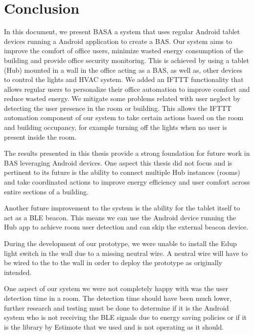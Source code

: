 \documentclass[conference]{IEEEtran}
\begin{document}
\section*{Conclusion}

In this document, we present BASA a system that uses regular Android tablet devices running a Android application to create a \ac{BAS}. Our system aims to improve the comfort of office users, minimize wasted energy consumption of the building and provide office security monitoring. 
This is achieved by using a tablet (Hub) mounted in a wall in the office acting as a \ac{BAS}, as well as, other devices to control the lights and \ac{HVAC} system. 
We added an \ac{IFTTT} functionality that allows regular users to personalize their office automation to improve comfort and reduce wasted energy. We mitigate some problems related with user neglect by detecting the user presence in the room or building. This allows the \ac{IFTTT} automation component of our system to take certain actions based on the room and building occupancy, for example turning off the lights when no user is present inside the room.

The results presented in this thesis provide a strong foundation for future work in \ac{BAS} leveraging Android devices. 
One aspect this thesis did not focus and is pertinent to its future is the ability to connect multiple Hub instances (rooms) and take coordinated actions to improve energy efficiency and user comfort across entire sections of a building. 

Another future improvement to the system is the ability for the tablet itself to act as a \ac{BLE} beacon. This means we can use the Android device running the Hub app to achieve room user detection and can skip the external beacon device.

During the development of our prototype, we were unable to install the Edup light switch in the wall due to a missing neutral wire. A neutral wire will have to be wired to the to the wall in order to deploy the prototype as originally intended. 

One aspect of our system we were not completely happy with was the user detection time in a room. The detection time should have been much lower, further research and testing must be done to determine if it is the Android system who is not receiving the BLE signals due to energy saving policies or if it is the library by Estimote that we used and is not operating as it should.
\end{document}

